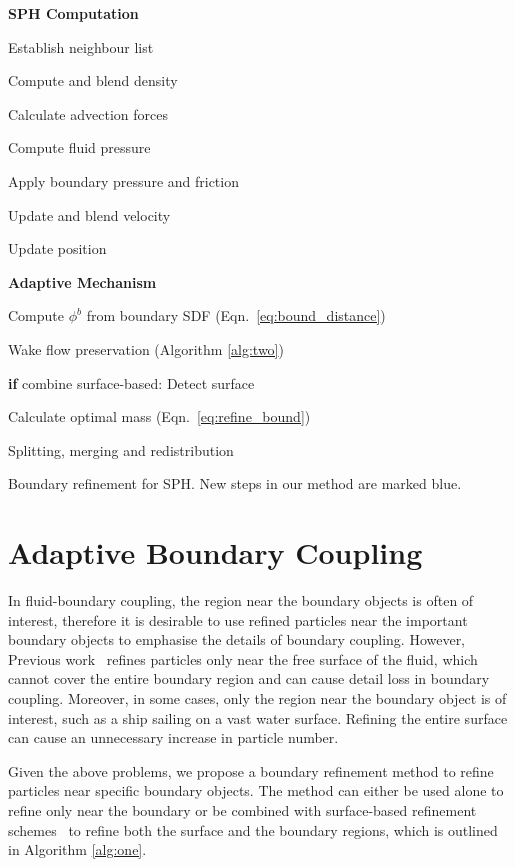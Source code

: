 \documentclass[VANCOUVER,STIX1COL]{WileyNJD-v2}
\begin{document}
\begin{algorithm}[htb]
\par\setlength\parindent{2em}
\noindent \textbf{SPH Computation} 

Establish neighbour list

Compute and blend density

Calculate advection forces

Compute fluid pressure

Apply boundary pressure and friction

Update and blend velocity

Update position

\noindent \textbf{Adaptive Mechanism} 

\textcolor[RGB]{71,156,233}{Compute $\phi^b$ from boundary SDF (Eqn.~\ref{eq:bound_distance})}

\textcolor[RGB]{71,156,233}{Wake flow preservation (Algorithm \ref{alg:two})}

\textbf{if} combine surface-based: Detect surface

\textcolor[RGB]{71,156,233}{Calculate optimal mass (Eqn.~\ref{eq:refine_bound})}

Splitting, merging and redistribution

\caption{Boundary refinement for SPH. New steps in our method are marked blue.}
\label{alg:one}
\end{algorithm}

\section{Adaptive Boundary Coupling}
\label{sec:adaptive_our}

In fluid-boundary coupling, the region near the boundary objects is often of interest, therefore it is desirable to use refined particles near the important boundary objects to emphasise the details of boundary coupling. However, Previous work~\cite{Winchenbach17} refines particles only near the free surface of the fluid, which cannot cover the entire boundary region and can cause detail loss in boundary coupling. Moreover, in some cases, only the region near the boundary object is of interest, such as a ship sailing on a vast water surface. Refining the entire surface can cause an unnecessary increase in particle number.

Given the above problems, we propose a boundary refinement method to refine particles near specific boundary objects. The method can either be used alone to refine only near the boundary or be combined with surface-based refinement schemes~\cite{Winchenbach17} to refine both the surface and the boundary regions, which is outlined in Algorithm \ref{alg:one}.
\end{document}
